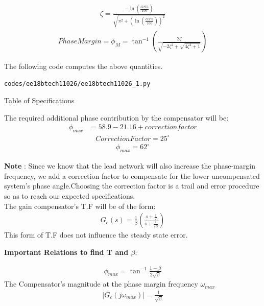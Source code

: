 \begin{enumerate}[label=\thesection.\arabic*.,ref=\thesection.\theenumi]
\begin{align}
    \zeta = \frac{-\ln\left(\frac{OS\%}{100}\right)}{\sqrt{\pi^2+\left(\ln\left(\frac{OS\%}{100}\right)\right)^2}}
\end{align}
\begin{align}
    Phase Margin = \phi_{M} = \tan^{-1}\left(\frac{2\zeta}{\sqrt{-2\zeta^2 + \sqrt{4\zeta^4 + 1}}}\right)  
\end{align}

The following code computes the above quantities.
\begin{lstlisting}
codes/ee18btech11026/ee18btech11026_1.py
\end{lstlisting}


\begin{table}[!ht]
\centering

\caption{Table of Specifications}
\label{table:ee18btech11026_table_1}
\end{table}
The required additional phase contribution by the compensator will be:
\begin{align}
     \phi_{max} & = 58.9 - 21.16 + correction factor
\end{align}
\begin{align}
     Correction Factor = 25^{\circ}
\end{align}
\begin{align}
    \phi_{max} = 62^{\circ}
\end{align}

\textbf{Note} : Since we know that the lead network will also increase the phase-margin frequency, we add a correction factor to compensate for the lower uncompensated system’s phase angle.Choosing the correction factor is a trail and error procedure so as to reach our expected specifications.\\
The gain compensator's T.F will be of the form:
\begin{align}
    G_{c}(s) = \frac{1}{\beta}\left(\frac{s+\frac{1}{T}}{s+\frac{1}{T\beta}}\right)
\end{align}
This form of T.F does not influence the steady state error.

\textbf{Important Relations to find T and $\beta$}:

\begin{align}
   \phi_{max} = \tan^{-1}\frac{1-\beta}{2\sqrt{\beta}}
\end{align}
The Compensator's magnitude at the phase margin frequency $\omega_{max}$
\begin{align}
     |G_{c}(j\omega_{max})| = \frac{1}{\sqrt{\beta}} 
\end{align}


\end{enumerate}
